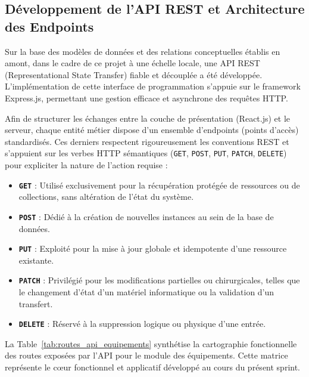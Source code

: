 \subsection{Développement de l’API REST et Architecture des Endpoints}
\label{subsec:api_rest_sprint1}

Sur la base des modèles de données et des relations conceptuelles établis en amont, dans le cadre de ce projet à une échelle locale, une API REST (Representational State Transfer) fiable et découplée a été développée. L’implémentation de cette interface de programmation s'appuie sur le framework Express.js, permettant une gestion efficace et asynchrone des requêtes HTTP.

Afin de structurer les échanges entre la couche de présentation (React.js) et le serveur, chaque entité métier dispose d’un ensemble d'endpoints (points d'accès) standardisés. Ces derniers respectent rigoureusement les conventions REST et s'appuient sur les verbes HTTP sémantiques (\texttt{GET}, \texttt{POST}, \texttt{PUT}, \texttt{PATCH}, \texttt{DELETE}) pour expliciter la nature de l'action requise :
\begin{itemize}
    \item \textbf{\texttt{GET}} : Utilisé exclusivement pour la récupération protégée de ressources ou de collections, sans altération de l'état du système.
    \item \textbf{\texttt{POST}} : Dédié à la création de nouvelles instances au sein de la base de données.
    \item \textbf{\texttt{PUT}} : Exploité pour la mise à jour globale et idempotente d'une ressource existante.
    \item \textbf{\texttt{PATCH}} : Privilégié pour les modifications partielles ou chirurgicales, telles que le changement d'état d'un matériel informatique ou la validation d'un transfert.
    \item \textbf{\texttt{DELETE}} : Réservé à la suppression logique ou physique d'une entrée.
\end{itemize}

La Table~\ref{tab:routes_api_equipements} synthétise la cartographie fonctionnelle des routes exposées par l'API pour le module des équipements. Cette matrice représente le cœur fonctionnel et applicatif développé au cours du présent sprint.

